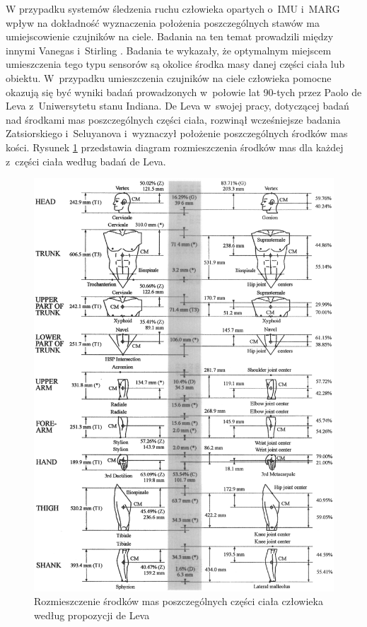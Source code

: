 W przypadku systemów śledzenia ruchu człowieka opartych o~IMU i~MARG wpływ na dokładność wyznaczenia położenia poszczególnych stawów ma umiejscowienie czujników na ciele. Badania na ten temat prowadzili między innymi Vanegas i~Stirling \cite{Vanegas2015}. Badania te wykazały, że optymalnym miejscem umieszczenia tego typu sensorów są okolice środka masy danej części ciała lub obiektu. W~przypadku umieszczenia czujników na ciele człowieka pomocne okazują się być wyniki badań prowadzonych w~połowie lat 90-tych przez Paolo de Leva z~Uniwersytetu stanu Indiana. De Leva w~swojej pracy, dotyczącej badań nad środkami mas poszczególnych części ciała\cite{DeLeva1996}, rozwinął wcześniejsze badania Zatsiorskiego i~Seluyanova \cite{549} i~wyznaczył położenie poszczególnych środków mas kości. Rysunek \ref{fig:centerOfMass} przedstawia diagram rozmieszczenia środków mas dla każdej z~części ciała według badań de Leva.
							
\begin{savenotes}
	\begin{figure}[!htb]
		\centering	
		\includegraphics[width=\textwidth]{images/centerOfMass.png}
		\caption[Rozmieszczenie środków mas poszczególnych części ciała człowieka według propozycji de Leva]{Rozmieszczenie środków mas poszczególnych części ciała człowieka według propozycji de Leva \cite{DeLeva1996}}	
		\label{fig:centerOfMass}	
	\end{figure}
\end{savenotes}
									
